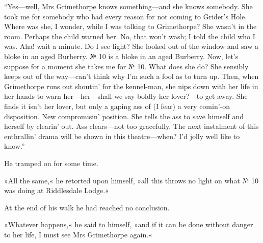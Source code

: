\enquote{Yes—well, Mrs Grimethorpe knows something—and she knows somebody.  She took me for somebody who had every reason for not coming to Grider's Hole. Where was she, I wonder, while I was talking to Grimethorpe? She wasn't in the room. Perhaps the child warned her. No, that won't wash; I told the child who I was. Aha! wait a minute. Do I see light? She looked out of the window and saw a bloke in an aged Burberry. № 10 is a bloke in an aged Burberry. Now, let's suppose for a moment she takes me for № 10. What does she do? She sensibly keeps out of the way—can't think why I'm such a fool as to turn up.  Then, when Grimethorpe runs out shoutin' for the kennel-man, she nips down with her life in her hands to warn her—her—shall we say boldly her lover?—to get away. She finds it isn't her lover, but only a gaping ass of (I fear) a very comin'-on disposition. New compromisin' position. She tells the ass to save himself and herself by clearin' out. Ass clears—not too gracefully. The next instalment of this enthrallin' drama will be shown in this theatre—when? I'd jolly well like to know.}

He tramped on for some time.

»All the same,« he retorted upon himself, »all this throws no light on what № 10 was doing at Riddlesdale Lodge.«

At the end of his walk he had reached no conclusion.

»Whatever happens,« he said to himself, »and if it can be done without danger to her life, I must see Mrs Grimethorpe again.«



